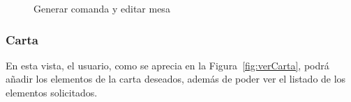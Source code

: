 \begin{figure}[h]
 \centering
     \hfill
 \caption{Generar comanda y editar mesa}
\label{fig:GenerarComandaYEditarMesa}
\end{figure}

\subsubsection*{Carta}
 En esta vista, el usuario, como se aprecia en la Figura~\ref{fig:verCarta}, podrá añadir los elementos de la carta deseados, además de poder ver el listado de los elementos solicitados.
 
